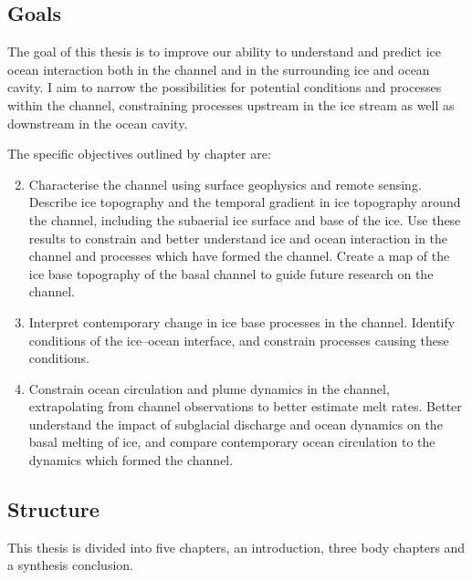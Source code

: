  
\subsection{Goals} \label{sec:objectives}

The goal of this thesis is to improve our ability to understand and predict ice ocean interaction both in the channel and in the surrounding ice and ocean cavity. I aim to narrow the possibilities for potential conditions and processes within the channel, constraining processes upstream in the ice stream as well as downstream in the ocean cavity. 

The specific objectives outlined by chapter are:
\begin{enumerate}
    \setcounter{enumi}{1}
    \item Characterise the channel using surface geophysics and remote sensing. Describe ice topography and the temporal gradient in ice topography around the channel, including the subaerial ice surface and base of the ice. Use these results to constrain and better understand ice and ocean interaction in the channel and processes which have formed the channel. Create a map of the ice base topography of the basal channel to guide future research on the channel.
    \item Interpret contemporary change in ice base processes in the channel. Identify conditions of the ice--ocean interface, and constrain processes causing these conditions. 
    \item Constrain ocean circulation and plume dynamics in the channel, extrapolating from channel observations to better estimate melt rates. Better understand the impact of subglacial discharge and ocean dynamics on the basal melting of ice, and compare contemporary ocean circulation to the dynamics which formed the channel. 
\end{enumerate}


\subsection{Structure} \label{sec:structure}


This thesis is divided into five chapters, an introduction, three body chapters and a synthesis conclusion. 
 
